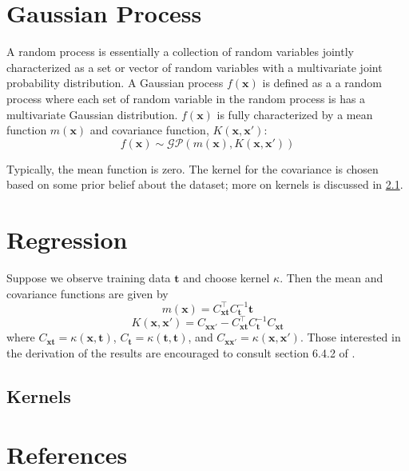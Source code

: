\documentclass{article}
\begin{document}
\section{Gaussian Process}
A random process is essentially a collection of random variables jointly characterized  as a set or vector of random variables with a multivariate joint probability distribution. A Gaussian process $f(\boldsymbol{x})$ is defined as a a random process where each set of random variable in the random process is has a multivariate Gaussian distribution. $f(\boldsymbol{x})$ is fully characterized by a mean function  $m(\boldsymbol{x})$ and covariance function, $K(\boldsymbol{x},\boldsymbol{x'})$:
\[f(\boldsymbol{x})\sim\mathcal{GP}(m(\boldsymbol{x}),K(\boldsymbol{x},\boldsymbol{x'}))\]

Typically, the mean function is zero. The kernel for the covariance is chosen based on some prior belief about the dataset; more on kernels is discussed in \ref{subsection:kernels}.

\section{Regression}
Suppose we observe training data $\boldsymbol{t}$ and choose kernel $\kappa$. Then the mean and covariance functions are given by
\[m(\boldsymbol{x})=C_{\boldsymbol{x}\boldsymbol{t}}^\top C_{\boldsymbol{t}}^{-1}\boldsymbol{t}\]
\[K(\boldsymbol{x},\boldsymbol{x'})=C_{\boldsymbol{x}\boldsymbol{x'}}-C_{\boldsymbol{x}\boldsymbol{t}}^\top C_{\boldsymbol{t}}^{-1}C_{\boldsymbol{x}\boldsymbol{t}}\]
where $C_{\boldsymbol{x}\boldsymbol{t}} = \kappa(\boldsymbol{x},\boldsymbol{t})$, $C_{\boldsymbol{t}} = \kappa(\boldsymbol{t},\boldsymbol{t})$, and $C_{\boldsymbol{x}\boldsymbol{x'}} = \kappa(\boldsymbol{x},\boldsymbol{x'})$.
Those interested in the derivation of the results are encouraged to consult section 6.4.2 of \cite{bishop_pattern_2006}.

\subsection{Kernels}

\label{subsection:kernels}

\section*{References}

\medskip

\small


\end{document}
